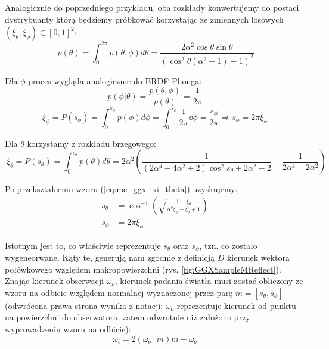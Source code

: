 \documentclass[../main.tex]{subfiles}
\begin{document}
Analogicznie do poprzedniego przykładu, oba rozkłady konwertujemy do postaci dystrybuanty którą będziemy próbkować korzystając ze zmiennych losowych $(\xi_{\theta}, \xi_{\phi}) \in [0,1]^2$:
\begin{equation}\
  p(\theta) = \int_{0}^{2\pi} {
    p(\theta, \phi) d \theta
  } =
  \frac{2 \alpha^2 \cos\theta \sin\theta}{
    \left(
      \cos^{2}\theta (\alpha^2 - 1) + 1
    \right)^{2}
  }
\end{equation}

Dla $\phi$ proces wygląda analogicznie do BRDF Phonga:
\begin{equation}
  p(\phi | \theta) = \frac{
    p(\theta, \phi)
	}{
		p(\theta)
	} = \frac{1}{2\pi}
\end{equation}
\begin{equation}
	\xi_\phi = P(s_{\phi}) =
	\int_{0}^{s_{\phi}} {
		p(\phi) d\phi
	} =
	\int_{0}^{s_{\phi}} {
		\frac{1}{2\pi}
        \dd \phi
	} =
	\frac{s_{\phi}}{2\pi}
  \Rightarrow
	s_{\phi} = 2 \pi \xi_{\phi}
\end{equation}

Dla $\theta$ korzystamy z rozkładu brzegowego:
\begin{equation}\
  \xi_\theta = P(s_{\theta}) =
	\int_{0}^{s_{\theta}} {
		p(\theta) d\theta
	} =
  2 \alpha^2 \left(
    \frac{1}{
      (2\alpha^4 - 4\alpha^2 + 2) \cos^{2}{s_\theta} + 2\alpha^2 - 2
    } - \frac{1}{
      2\alpha^4 - 2\alpha^2
    }
  \right)
\label{eq:mc_ggx_xi_theta}
\end{equation}

Po przekształceniu wzoru (\ref{eq:mc_ggx_xi_theta}) uzyskujemy:
\begin{equation}\begin{aligned}
  s_\theta &= \cos^{-1}\left(
    \sqrt{
      \frac{1 - \xi_\theta}{\alpha^2 \xi_\theta - \xi_\theta + 1}
    }
  \right) \\
  s_{\phi} &= 2 \pi \xi_{\phi}
\end{aligned}\end{equation}

Istotnym jest to, co właściwie reprezentuje $s_\theta$ oraz $s_\phi$, tzn. co zostało wygeneorwane. Kąty te, generują nam zgodnie z definicją $D$ kierunek wektora połówkowego względem makropowierzchni (rys. \ref{fig:GGXSampleMReflect}). Znając kierunek obserwacji $\omega_o$, kierunek padania światła musi zostać obliczony ze wzoru na odbicie względem normalnej wyznaczonej przez parę $m = [s_\theta, s_\phi]$ (odwrócona prawa strona wynika z notacji: $\omega_o$ reprezentuje kierunek od punktu na powierzchni do obserwatora, zatem odwrotnie niż założono przy wyprowadzeniu wzoru na odbicie):
\begin{equation}
	\omega_i = 2(\omega_o \cdot m)m - \omega_o
\end{equation}
\end{document}

